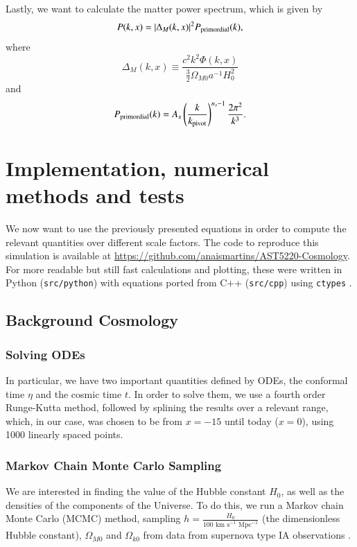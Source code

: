 \documentclass{aa}
\begin{document}
Lastly, we want to calculate the matter power spectrum, which is given by
\begin{equation}
P(k,x) = |\Delta_M(k,x)|^2P_{\rm primordial}(k),
\end{equation}
where
\begin{equation}
\Delta_M(k,x) \equiv \frac{c^2k^2\Phi(k,x)}{\frac{3}{2}\Omega_{M 0} a^{-1} H_0^2}
\end{equation}
and
\begin{equation}
    P_{\rm primordial}(k) = A_s \left(\frac{k}{k_{\rm pivot}}\right)^{n_s-1}\frac{2\pi^2}{k^3}.
\end{equation}

\section{Implementation, numerical methods and tests}

We now want to use the previously presented equations in order to compute the relevant quantities over different scale factors. The code to reproduce this simulation is available at \url{https://github.com/anaismartins/AST5220-Cosmology}. For more readable but still fast calculations and plotting, these were written in Python (\texttt{src/python}) with equations ported from C++ (\texttt{src/cpp}) using \texttt{ctypes} \citep{ctypes}.

\subsection{Background Cosmology}

\subsubsection{Solving ODEs}

In particular, we have two important quantities defined by ODEs, the conformal time $\eta$ and the cosmic time $t$. In order to solve them, we use a fourth order Runge-Kutta method, followed by splining the results over a relevant range, which, in our case, was chosen to be from $x=-15$ until today ($x=0$), using 1000 linearly spaced points.

\subsubsection{Markov Chain Monte Carlo Sampling}

We are interested in finding the value of the Hubble constant $H_0$, as well as the densities of the components of the Universe. To do this, we run a Markov chain Monte Carlo (MCMC) method, sampling $h = \frac{H_0}{100\text{ km s}^{-1}\text{ Mpc}^{-1}}$ (the dimensionless Hubble constant), $\Omega_{M0}$ and $\Omega_{k0}$ from data from supernova type IA observations \citep{Betoule_2014}.
\end{document}
